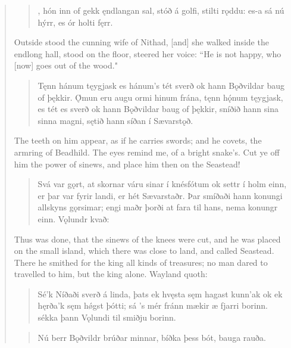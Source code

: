 \begin{verse}
\begin{verse}
,
hón inn of gekk \hld ęndlangan sal,
stóð á golfi, \hld stilti rǫddu:
es-a sá nú hýrr, \hld es ór holti fęrr. \\%
\end{verse}

\bvb Outside stood the cunning wife of Nithad, [and] she walked inside the endlong hall, stood on the floor, steered her voice: “He is not happy, who [now] goes out of the wood."

\begin{verse}
\bva Tęnn hánum tęygjask \hld es hánum's tét sverð
ok hann Bǫðvildar \hld baug of þękkir.
Ǫ́mun eru augu \hld ormi hinum frána,
tęnn hǫ́num tęygjask, \hld es tét es sverð
ok hann Bǫðvildar \hld baug of þękkir,
sníðið hann sina \hld sinna magni,
sętið hann síðan \hld í Sævarstǫð. \\%
\end{verse}

\bvb The teeth on him appear, as if he carries swords; and he covets, the armring of Beadhild. The eyes remind me, of a bright snake's. Cut ye off him the power of sinews, and place him then on the Seastead!

\begin{verse}
\bva Svá var gǫrt, at skornar váru sinar í knésfótum ok settr í holm einn, er þar var fyrir landi, er hét Sævarstaðr. Þar smíðaði hann konungi allskyns gǫrsimar; engi maðr þorði at fara til hans, nema konungr einn. Vǫlundr kvað: \\%
\end{verse}

\bvb Thus was done, that the sinews of the knees were cut, and he was placed on the small island, which there was close to land, and called Seastead. There he smithed for the king all kinds of treasures; no man dared to travelled to him, but the king alone. Wayland quoth: \\

\begin{verse}
\bva Sé'k Níðaði \hld sverð á linda,
þats ek hvęsta \hld sęm hagast kunn'ak
ok ek hęrða'k \hld sęm hǿgst þótti;
sá 's mér fránn mækir \hld æ fjarri borinn.
sékka þann Vǫlundi \hld til smiðju borinn. \\%
\end{verse}


\begin{verse}
\bva Nú berr Bǫðvildr \hld brúðar minnar,
bíðka þess bót, \hld bauga rauða. \\%
\end{verse}


\end{verse}
